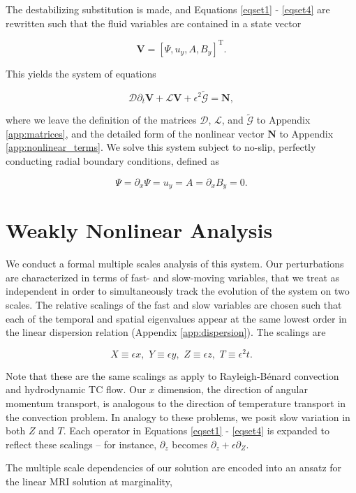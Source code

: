 \documentclass{emulateapj}
\newcommand{\beq}{\begin{equation}}
\newcommand{\eeq}{\end{equation}}
\begin{document}
The destabilizing substitution is made, and Equations \ref{eqset1} - \ref{eqset4} are rewritten such that the fluid variables are contained in a state vector 

\beq
\mathbf{V} = \left[\Psi, u_y, A, B_y\right]^\mathrm{T}.
\eeq

This yields the system of equations

\beq
\label{eq:unperturbed_matrix_equations}
 \mathcal{D}\partial_t \mathbf{V} +  \mathcal{L} \mathbf{V} + \epsilon^2\widetilde{\mathcal{G}} = \mathbf{N},
\eeq

where we leave the definition of the matrices $\mathcal{D}$, $\mathcal{L}$, and $\widetilde{\mathcal{G}}$ to Appendix \ref{app:matrices}, and the detailed form of the nonlinear vector $\mathbf{N}$ to Appendix \ref{app:nonlinear_terms}. We solve this system subject to no-slip, perfectly conducting radial boundary conditions, defined as

\beq\label{eq:wallbcs}
\Psi = \partial_x \Psi = u_y = A = \partial_x B_y = 0.
\eeq


\section{Weakly Nonlinear Analysis}\label{sec:wnl}

We conduct a formal multiple scales analysis of this system. Our perturbations are characterized in terms of fast- and slow-moving variables, that we treat as independent in order to simultaneously track the evolution of the system on two scales. The relative scalings of the fast and slow variables are chosen such that each of the temporal and spatial eigenvalues appear at the same lowest order in the linear dispersion relation (Appendix \ref{app:dispersion}). The scalings are

\beq\label{scalings}
X \equiv \epsilon x,  \, \, Y \equiv \epsilon y, \, \, Z \equiv \epsilon z, \, \, T \equiv \epsilon^2 t.
\eeq

Note that these are the same scalings as apply to Rayleigh-B\'enard convection and hydrodynamic TC flow. Our $x$ dimension, the direction of angular momentum transport, is analogous to the direction of temperature transport in the convection problem. In analogy to these problems, we posit slow variation in both $Z$ and $T$. Each operator in Equations \ref{eqset1} - \ref{eqset4} is expanded to reflect these scalings -- for instance, $\partial_z$ becomes $\partial_z + \epsilon\partial_Z$. 

The multiple scale dependencies of our solution are encoded into an ansatz for the linear MRI solution at marginality,
\end{document}
